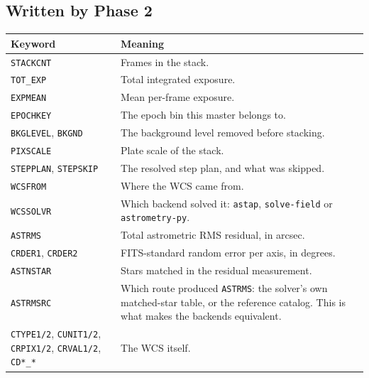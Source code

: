 \documentclass[11pt,a4paper]{article}
\begin{document}
\subsection{Written by Phase 2}
\begin{center}
\begin{longtable}{|p{3.3cm}|p{11.2cm}|}
\hline
\textbf{Keyword} & \textbf{Meaning} \\
\hline
\endhead
\texttt{STACKCNT} & Frames in the stack. \\
\hline
\texttt{TOT\_EXP} & Total integrated exposure. \\
\hline
\texttt{EXPMEAN} & Mean per-frame exposure. \\
\hline
\texttt{EPOCHKEY} & The epoch bin this master belongs to. \\
\hline
\texttt{BKGLEVEL}, \texttt{BKGND} & The background level removed before stacking. \\
\hline
\texttt{PIXSCALE} & Plate scale of the stack. \\
\hline
\texttt{STEPPLAN}, \texttt{STEPSKIP} & The resolved step plan, and what was skipped. \\
\hline
\texttt{WCSFROM} & Where the WCS came from. \\
\hline
\texttt{WCSSOLVR} & Which backend solved it: \texttt{astap}, \texttt{solve-field} or \texttt{astrometry-py}. \\
\hline
\texttt{ASTRMS} & Total astrometric RMS residual, in arcsec. \\
\hline
\texttt{CRDER1}, \texttt{CRDER2} & FITS-standard random error per axis, in degrees. \\
\hline
\texttt{ASTNSTAR} & Stars matched in the residual measurement. \\
\hline
\texttt{ASTRMSRC} & Which route produced \texttt{ASTRMS}: the solver's own matched-star table, or the reference catalog. This is what makes the backends equivalent. \\
\hline
\texttt{CTYPE1/2}, \texttt{CUNIT1/2}, \texttt{CRPIX1/2}, \texttt{CRVAL1/2}, \texttt{CD*\_*} & The WCS itself. \\
\hline
\end{longtable}
\end{center}
\end{document}
